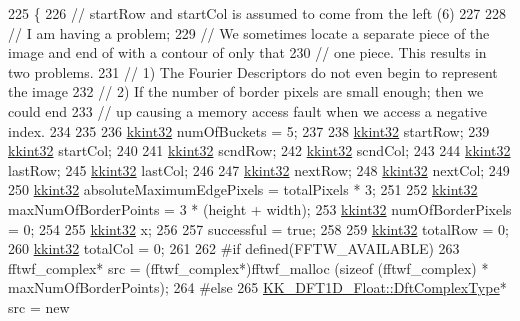 \begin{DoxyCode}
225 \{
226   \textcolor{comment}{// startRow and startCol is assumed to come from the left (6)}
227 
228   \textcolor{comment}{// I am having a problem;  }
229   \textcolor{comment}{//     We sometimes locate a separate piece of the image and end of with a contour of only that}
230   \textcolor{comment}{//     one piece.  This results in two problems.}
231   \textcolor{comment}{//                    1) The Fourier Descriptors do not even begin to represent the image}
232   \textcolor{comment}{//                    2) If the number of border pixels are small enough; then we could end}
233   \textcolor{comment}{//                       up causing a memory access fault when we access a negative index.}
234 
235 
236   \hyperlink{namespace_k_k_b_a8fa4952cc84fda1de4bec1fbdd8d5b1b}{kkint32}  numOfBuckets = 5;
237 
238   \hyperlink{namespace_k_k_b_a8fa4952cc84fda1de4bec1fbdd8d5b1b}{kkint32}  startRow;
239   \hyperlink{namespace_k_k_b_a8fa4952cc84fda1de4bec1fbdd8d5b1b}{kkint32}  startCol;
240 
241   \hyperlink{namespace_k_k_b_a8fa4952cc84fda1de4bec1fbdd8d5b1b}{kkint32}  scndRow;
242   \hyperlink{namespace_k_k_b_a8fa4952cc84fda1de4bec1fbdd8d5b1b}{kkint32}  scndCol;
243 
244   \hyperlink{namespace_k_k_b_a8fa4952cc84fda1de4bec1fbdd8d5b1b}{kkint32}  lastRow;
245   \hyperlink{namespace_k_k_b_a8fa4952cc84fda1de4bec1fbdd8d5b1b}{kkint32}  lastCol;
246 
247   \hyperlink{namespace_k_k_b_a8fa4952cc84fda1de4bec1fbdd8d5b1b}{kkint32}  nextRow;
248   \hyperlink{namespace_k_k_b_a8fa4952cc84fda1de4bec1fbdd8d5b1b}{kkint32}  nextCol;
249 
250   \hyperlink{namespace_k_k_b_a8fa4952cc84fda1de4bec1fbdd8d5b1b}{kkint32}  absoluteMaximumEdgePixels = totalPixels * 3;
251 
252   \hyperlink{namespace_k_k_b_a8fa4952cc84fda1de4bec1fbdd8d5b1b}{kkint32}  maxNumOfBorderPoints = 3 * (height + width);
253   \hyperlink{namespace_k_k_b_a8fa4952cc84fda1de4bec1fbdd8d5b1b}{kkint32}  numOfBorderPixels = 0;
254 
255   \hyperlink{namespace_k_k_b_a8fa4952cc84fda1de4bec1fbdd8d5b1b}{kkint32} x;
256 
257   successful = \textcolor{keyword}{true};
258 
259   \hyperlink{namespace_k_k_b_a8fa4952cc84fda1de4bec1fbdd8d5b1b}{kkint32}  totalRow = 0;
260   \hyperlink{namespace_k_k_b_a8fa4952cc84fda1de4bec1fbdd8d5b1b}{kkint32}  totalCol = 0;
261 
262 \textcolor{preprocessor}{  #if  defined(FFTW\_AVAILABLE)}
263   fftwf\_complex*  src = (fftwf\_complex*)fftwf\_malloc (\textcolor{keyword}{sizeof} (fftwf\_complex) * maxNumOfBorderPoints);
264 \textcolor{preprocessor}{  #else}
265   \hyperlink{class_k_k_b_1_1_k_k___d_f_t1_d_a4cbc827157dd30ddec2d3753e552a827}{KK\_DFT1D\_Float::DftComplexType}*  src = \textcolor{keyword}{new} 

\end{DoxyCode}
